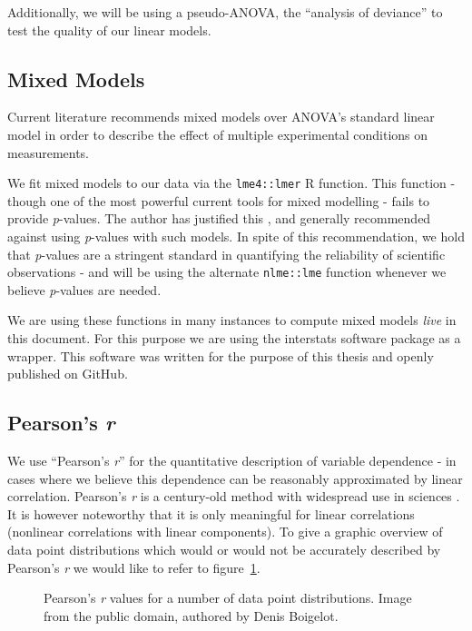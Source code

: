 	    Additionally, we will be using a pseudo-ANOVA, the “analysis of deviance” \citep{Hastie1992} to test the quality of our linear models. 
	\subsection{Mixed Models}\label{sec:m_sa_lm}
	    Current literature \citep{Baayen2008} recommends mixed models over ANOVA's standard linear model in order to describe the effect of multiple experimental conditions on measurements.
	    
	    We fit mixed models to our data via the \colorbox{vlg}{\texttt{lme4::lmer}} \citep{Bates2005,Bates2007} R function.
	    This function - though one of the most powerful current tools for mixed modelling - fails to provide \textit{p}-values.
	    The author has justified this \citep{Bates2006}, and generally recommended against using \textit{p}-values with such models.
	    In spite of this recommendation, we hold that \textit{p}-values are a stringent standard in quantifying the reliability of scientific observations -
	    and will be using the alternate \colorbox{vlg}{\texttt{nlme::lme}} \citep{Pinheiro2013} function whenever we believe \textit{p}-values are needed.
	    
	    We are using these functions in many instances to compute mixed models \textit{live} in this document.
	    For this purpose we are using the interstats \citep{interstats} software package as a wrapper.
	    This software was written for the purpose of this thesis and openly published on GitHub\citep{github}.
	\subsection{Pearson's \textit{r}}
	    We use “Pearson's \textit{r}” for the quantitative description of variable dependence - in cases where we believe this dependence can be reasonably approximated by linear correlation.
	    Pearson's \textit{r} is a century-old method with widespread use in sciences \citep{Stigler1989}.
	    It is however noteworthy that it is only meaningful for linear correlations (nonlinear correlations with linear components).
	    To give a graphic overview of data point distributions which would or would not be accurately described by Pearson's \textit{r} we would like to refer to figure~\ref{fig:m_sa_pr}.
	    
	    \begin{figure}[htb]
		\centering
		\scalebox{1.11}{}
		\caption{Pearson's \textit{r} values for a number of data point distributions. \textcolor{lg}{Image from the public domain, authored by Denis Boigelot.}}
		\label{fig:m_sa_pr}
	    \end{figure}
	    
